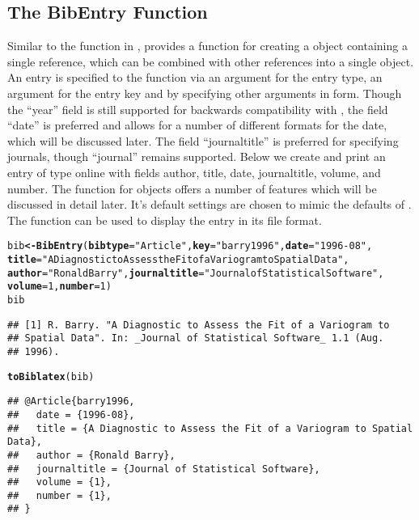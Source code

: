 \documentclass[article]{jss}\usepackage[]{graphicx}\usepackage[]{color}
\makeatletter
\newcommand{\hlnum}[1]{\textcolor[rgb]{0.125,0.125,1}{#1}}%
\newcommand{\hlstr}[1]{\textcolor[rgb]{0.125,0.125,1}{#1}}%
\newcommand{\hlstd}[1]{\textcolor[rgb]{0.251,0.251,0.282}{#1}}%
\newcommand{\hlkwb}[1]{\textcolor[rgb]{0.439,0.251,1}{\textbf{#1}}}%
\newcommand{\hlkwc}[1]{\textcolor[rgb]{0.529,0,0.184}{\textbf{#1}}}%
\newcommand{\hlkwd}[1]{\textcolor[rgb]{0.251,0.251,0.282}{\textbf{#1}}}%
\newenvironment{kframe}{%
 \def\at@end@of@kframe{}%
 \ifinner\ifhmode%
  \def\at@end@of@kframe{\end{minipage}}%
  \begin{minipage}{\columnwidth}%
 \fi\fi%
 \def\FrameCommand##1{\hskip\@totalleftmargin \hskip-\fboxsep
 \colorbox{shadecolor}{##1}\hskip-\fboxsep
     \hskip-\linewidth \hskip-\@totalleftmargin \hskip\columnwidth}%
 \MakeFramed {\advance\hsize-\width
   \@totalleftmargin\z@ \linewidth\hsize
   \@setminipage}}%
 {\par\unskip\endMakeFramed%
 \at@end@of@kframe}
\newenvironment{knitrout}{}{} %
\newcommand{\ourpkg}{\pkg{RefManageR}}
\makeatother
\begin{document}
\subsection{The BibEntry Function}
Similar to the  function in , \ourpkg{} provides a function  for creating a  object containing a single reference, which can be combined with other references into a single  object.  An entry is specified to the  function via an argument  for the entry type, an argument  for the entry key and by specifying other arguments
in  form.  Though the ``year'' field is still supported for backwards compatibility with \Bibtex{}, the field ``date'' is preferred and allows for a number of different formats for the date, which will be discussed later.  The field ``journaltitle'' is preferred for specifying journals, though ``journal'' remains supported.  Below we create and print an entry of type online with fields author, title, date, journaltitle, volume, and number.  The  function for  objects offers a number of features which will be discussed in detail later.  It's default settings are chosen to mimic the defaults of \Biblatex{}.  The  function can be used to display the entry in its  file format.
\begin{knitrout}
\color{fgcolor}\begin{kframe}
\begin{alltt}
\hlstd{bib} \hlkwb{<-} \hlkwd{BibEntry}\hlstd{(}\hlkwc{bibtype}\hlstd{=}\hlstr{"Article"}\hlstd{,} \hlkwc{key} \hlstd{=} \hlstr{"barry1996"}\hlstd{,} \hlkwc{date} \hlstd{=} \hlstr{"1996-08"}\hlstd{,}
  \hlkwc{title} \hlstd{=} \hlstr{"A Diagnostic to Assess the Fit of a Variogram to Spatial Data"}\hlstd{,}
  \hlkwc{author} \hlstd{=} \hlstr{"Ronald Barry"}\hlstd{,} \hlkwc{journaltitle} \hlstd{=} \hlstr{"Journal of Statistical Software"}\hlstd{,}
                 \hlkwc{volume} \hlstd{=} \hlnum{1}\hlstd{,} \hlkwc{number} \hlstd{=} \hlnum{1}\hlstd{)}
\hlstd{bib}
\end{alltt}
\begin{verbatim}
## [1] R. Barry. "A Diagnostic to Assess the Fit of a Variogram to
## Spatial Data". In: _Journal of Statistical Software_ 1.1 (Aug.
## 1996).
\end{verbatim}
\begin{alltt}
\hlkwd{toBiblatex}\hlstd{(bib)}
\end{alltt}
\begin{verbatim}
## @Article{barry1996,
##   date = {1996-08},
##   title = {A Diagnostic to Assess the Fit of a Variogram to Spatial Data},
##   author = {Ronald Barry},
##   journaltitle = {Journal of Statistical Software},
##   volume = {1},
##   number = {1},
## }
\end{verbatim}
\end{kframe}
\end{knitrout}
\end{document}
